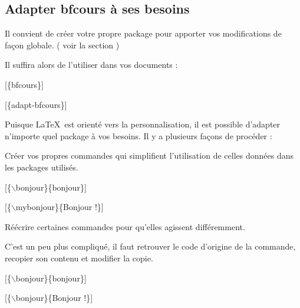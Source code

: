 \subsection{Adapter bfcours à ses besoins}

\begin{Methode}
Il convient de créer votre propre package pour apporter vos modifications de façon globale. ( voir la section )

Il suffira alors de l'utiliser dans vos documents : 

[\{bfcours\}]

[\{adapt-bfcours\}]
\end{Methode}
\begin{Methode}
Puisque \LaTeX\ est orienté vers la personnalisation, il est possible d'adapter n'importe quel package à vos besoins. 
Il y a plusieurs façons de procéder : 
\begin{tcbenumerate}[2]
    \tcbitem Créer vos propres commandes qui simplifient l'utilisation de celles données dans les packages utilisés. 

    [\{$\backslash$bonjour\}\{bonjour\}] 

    [\{$\backslash$mybonjour\}\{Bonjour !\}] 

    \tcbitem Réécrire certaines commandes pour qu'elles agissent différemment. 

    C'est un peu plus compliqué, il faut retrouver le code d'origine de la commande, recopier son contenu et modifier la copie. 

    [\{$\backslash$bonjour\}\{bonjour\}] 

    [\{$\backslash$bonjour\}\{Bonjour !\}] 
\end{tcbenumerate}
\end{Methode}
